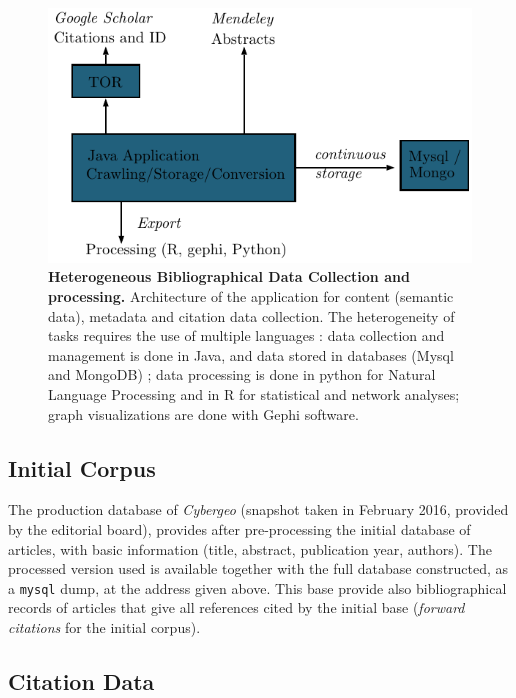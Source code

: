 \begin{figure}
\includegraphics[width=\textwidth]{figures/Fig1.pdf}
\caption{\textbf{Heterogeneous Bibliographical Data Collection and processing.} Architecture of the application for content (semantic data), metadata and citation data collection. The heterogeneity of tasks requires the use of multiple languages : data collection and management is done in Java, and data stored in databases (Mysql and MongoDB) ; data processing is done in python for Natural Language Processing and in R for statistical and network analyses; graph visualizations are done with Gephi software.}
\label{fig:datacollection}
\end{figure}




\subsection*{Initial Corpus}

The production database of \textit{Cybergeo} (snapshot taken in February 2016, provided by the editorial board), provides after pre-processing the initial database of articles, with basic information (title, abstract, publication year, authors). The processed version used is available together with the full database constructed, as a \texttt{mysql} dump, at the address given above. This base provide also bibliographical records of articles that give all references cited by the initial base (\emph{forward citations} for the initial corpus).



\subsection*{Citation Data}

